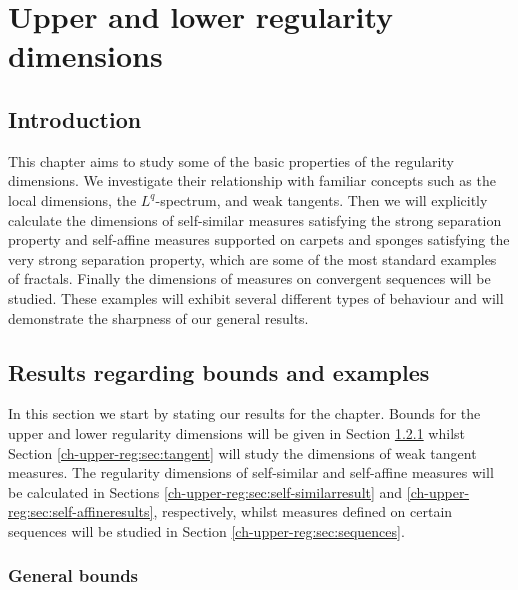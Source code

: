 \chapter{Upper and lower regularity dimensions}
\label{chap:upper_reg}


\section{Introduction}
\label{ch-upper-reg:intro-reg-dims}


This chapter aims to study some of the basic properties of the regularity dimensions. We investigate their relationship with familiar concepts such as the local dimensions, the $L^q$-spectrum, and weak tangents. Then we will explicitly calculate the dimensions of self-similar measures satisfying the strong separation property and self-affine measures supported on carpets and sponges satisfying the very strong separation property, which are some of the most standard examples of fractals. Finally the dimensions of measures on convergent sequences will be studied. These examples will exhibit several different types of behaviour and will demonstrate the sharpness of our general results. 


\section{Results regarding bounds and examples}\label{ch-upper-reg:results}

In this section we start by stating our results for the chapter. Bounds for the upper and lower regularity dimensions will be given in Section \ref{ch-upper-reg:bounds} whilst Section \ref{ch-upper-reg:sec:tangent} will study the dimensions of weak tangent measures. The regularity dimensions of self-similar and self-affine measures will be calculated in Sections \ref{ch-upper-reg:sec:self-similarresult} and \ref{ch-upper-reg:sec:self-affineresults}, respectively, whilst measures defined on certain sequences will be studied in Section \ref{ch-upper-reg:sec:sequences}. 

\subsection{General bounds}\label{ch-upper-reg:bounds}

